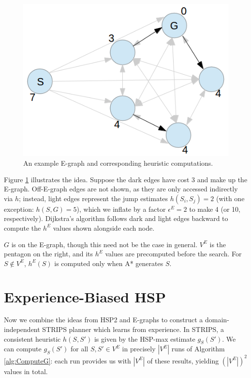 \documentclass[letterpaper]{article}
\begin{document}
\begin{figure}
	\begin{center}
	\includegraphics[scale=0.5]{Pentagon.png}
	\end{center}
	\caption{An example E-graph and corresponding heuristic computations.}
	\label{fig:example}
\end{figure}

Figure \ref{fig:example} illustrates the idea. Suppose the dark edges have cost 3 and make up the E-graph. Off-E-graph edges are not shown, as they are only accessed indirectly via $h$; instead, light edges represent the jump estimates $h(S_i,S_j) = 2$ (with one exception: $h(S,G) = 5$), which we inflate by a factor $\epsilon^E=2$ to make 4 (or 10, respectively). Dijkstra's algorithm follows dark and light edges backward to compute the $h^E$ values shown alongside each node.

$G$ is on the E-graph, though this need not be the case in general. $V^E$ is the pentagon on the right, and its $h^E$ values are precomputed before the search. For $S\notin V^E$, $h^E(S)$ is computed only when A* generates $S$.

\section{Experience-Biased HSP}

Now we combine the ideas from HSP2 and E-graphs to construct a domain-independent STRIPS planner which learns from experience. In STRIPS, a consistent heuristic $h(S,S')$ is given by the HSP-max estimate $g_S(S')$. We can compute $g_S(S')$ for all $S,S'\in V^E$ in precisely $|V^E|$ runs of Algorithm \ref{alg:ComputeG}: each run provides us with $|V^E|$ of these results, yielding $(|V^E|)^2$ values in total.
\end{document}
